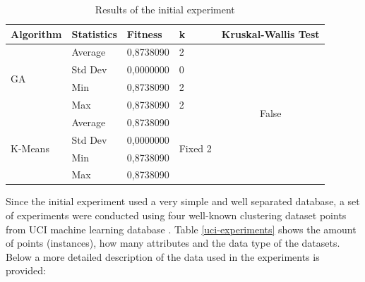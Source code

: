 \documentclass[journal]{IEEEtran}
\begin{document}
\begin{table}[]
	\centering
	\caption{Results of the initial experiment}
	\label{tab:resultsInitial}
	\begin{tabular}{|l|l|l|l|c|}
		\hline
		Algorithm                & Statistics & Fitness   & k                                             & \multicolumn{1}{l|}{Kruskal-Wallis Test} \\ \hline
		\multirow{4}{*}{GA}      & Average    & 0,8738090 & 2                                             & \multirow{8}{*}{False}                   \\ \cline{2-4}
		& Std Dev    & 0,0000000 & 0                                             &                                          \\ \cline{2-4}
		& Min        & 0,8738090 & 2                                             &                                          \\ \cline{2-4}
		& Max        & 0,8738090 & 2                                             &                                          \\ \cline{1-4}
		\multirow{4}{*}{K-Means} & Average    & 0,8738090 & \multicolumn{1}{c|}{\multirow{4}{*}{Fixed 2}} &                                          \\ \cline{2-3}
		& Std Dev    & 0,0000000 & \multicolumn{1}{c|}{}                         &                                          \\ \cline{2-3}
		& Min        & 0,8738090 & \multicolumn{1}{c|}{}                         &                                          \\ \cline{2-3}
		& Max        & 0,8738090 & \multicolumn{1}{c|}{}                         &                                          \\ \hline
	\end{tabular}
\end{table}

Since the initial experiment used a very simple and well separated database, a set of experiments were conducted using  four well-known clustering dataset points from UCI machine learning database \cite{uci}. Table \ref{uci-experiments} shows the amount of points (instances), how many attributes and the data type of the datasets. Below a more detailed description of the data used in the experiments is provided:
\end{document}

